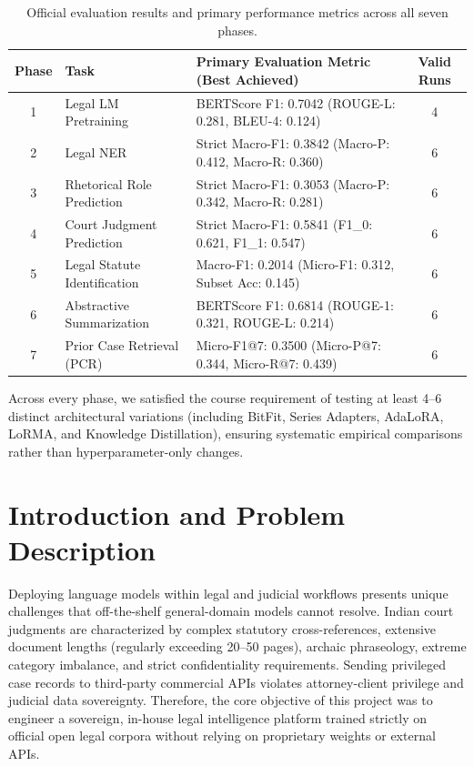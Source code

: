 \documentclass[11pt, oneside]{article}
\begin{document}
\begin{table}[H]
\centering
\small
\caption{Official evaluation results and primary performance metrics across all seven phases.}
\label{tab:leaderboard}
\begin{tabularx}{\textwidth}{clXc}
\toprule
\textbf{Phase} & \textbf{Task} & \textbf{Primary Evaluation Metric (Best Achieved)} & \textbf{Valid Runs} \\
\midrule
1 & Legal LM Pretraining & BERTScore F1: 0.7042 (ROUGE-L: 0.281, BLEU-4: 0.124) & 4 \\
2 & Legal NER & Strict Macro-F1: 0.3842 (Macro-P: 0.412, Macro-R: 0.360) & 6 \\
3 & Rhetorical Role Prediction & Strict Macro-F1: 0.3053 (Macro-P: 0.342, Macro-R: 0.281) & 6 \\
4 & Court Judgment Prediction & Strict Macro-F1: 0.5841 (F1\_0: 0.621, F1\_1: 0.547) & 6 \\
5 & Legal Statute Identification & Macro-F1: 0.2014 (Micro-F1: 0.312, Subset Acc: 0.145) & 6 \\
6 & Abstractive Summarization & BERTScore F1: 0.6814 (ROUGE-1: 0.321, ROUGE-L: 0.214) & 6 \\
7 & Prior Case Retrieval (PCR) & Micro-F1@7: 0.3500 (Micro-P@7: 0.344, Micro-R@7: 0.439) & 6 \\
\bottomrule
\end{tabularx}
\end{table}

\noindent
Across every phase, we satisfied the course requirement of testing at least 4--6 distinct architectural variations (including BitFit, Series Adapters, AdaLoRA, LoRMA, and Knowledge Distillation), ensuring systematic empirical comparisons rather than hyperparameter-only changes.

\section{Introduction and Problem Description}
\noindent
Deploying language models within legal and judicial workflows presents unique challenges that off-the-shelf general-domain models cannot resolve. Indian court judgments are characterized by complex statutory cross-references, extensive document lengths (regularly exceeding 20--50 pages), archaic phraseology, extreme category imbalance, and strict confidentiality requirements. Sending privileged case records to third-party commercial APIs violates attorney-client privilege and judicial data sovereignty. Therefore, the core objective of this project was to engineer a sovereign, in-house legal intelligence platform trained strictly on official open legal corpora without relying on proprietary weights or external APIs.
\end{document}
